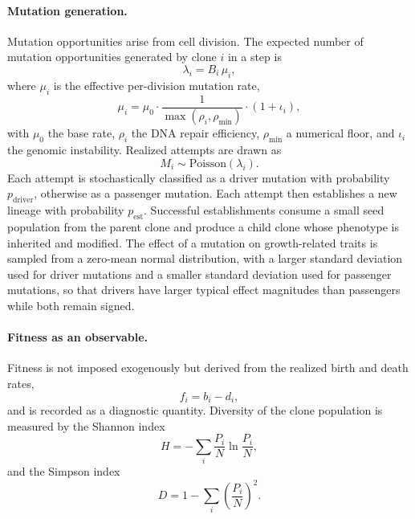 \documentclass[12pt,a4paper]{article}
\begin{document}
\paragraph{Mutation generation.}
Mutation opportunities arise from cell division. The expected number of mutation opportunities generated by clone $i$ in a step is
\begin{equation}
\lambda_i = B_i \, \mu_i,
\end{equation}
where $\mu_i$ is the effective per-division mutation rate,
\begin{equation}
\mu_i = \mu_0 \cdot \frac{1}{\max(\rho_i, \rho_{\min})} \cdot (1 + \iota_i),
\end{equation}
with $\mu_0$ the base rate, $\rho_i$ the DNA repair efficiency, $\rho_{\min}$ a numerical floor, and $\iota_i$ the genomic instability. Realized attempts are drawn as
\begin{equation}
M_i \sim \mathrm{Poisson}(\lambda_i).
\end{equation}
Each attempt is stochastically classified as a driver mutation with probability $p_{\mathrm{driver}}$, otherwise as a passenger mutation. Each attempt then establishes a new lineage with probability $p_{\mathrm{est}}$. Successful establishments consume a small seed population from the parent clone and produce a child clone whose phenotype is inherited and modified. The effect of a mutation on growth-related traits is sampled from a zero-mean normal distribution, with a larger standard deviation used for driver mutations and a smaller standard deviation used for passenger mutations, so that drivers have larger typical effect magnitudes than passengers while both remain signed.

\paragraph{Fitness as an observable.}
Fitness is not imposed exogenously but derived from the realized birth and death rates,
\begin{equation}
f_i = b_i - d_i,
\end{equation}
and is recorded as a diagnostic quantity. Diversity of the clone population is measured by the Shannon index
\begin{equation}
H = -\sum_i \frac{P_i}{N} \ln \frac{P_i}{N},
\end{equation}
and the Simpson index
\begin{equation}
D = 1 - \sum_i \left(\frac{P_i}{N}\right)^{2}.
\end{equation}
\end{document}
